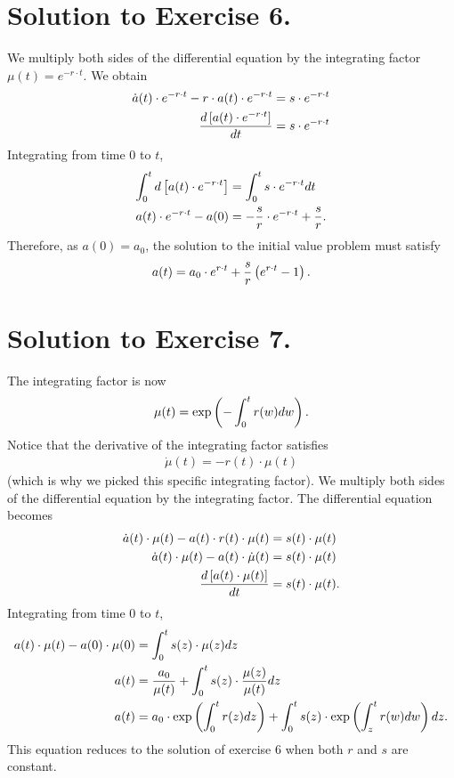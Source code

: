 \documentclass[letterpaper,12pt,leqno]{article}
\begin{document}
\section*{Solution to Exercise 6.}

We multiply both sides of the differential equation by the integrating factor $\mu (t)=e^{-r\cdot t}$. We obtain
\begin{align*}
\dot{a}(t)\cdot e^{-r\cdot t}-r\cdot a(t) \cdot e^{-r\cdot t}&=s\cdot e^{-r\cdot t}\\
\frac{d \left[ a(t)\cdot e^{-r\cdot t} \right]}{d t}&=s\cdot e^{-r\cdot t}
\end{align*}
Integrating from time $0$ to $t$, 
\begin{align*}
\int_{0}^{t}d\left[ a(t)\cdot e^{-r\cdot t} \right]&=\int_{0}^{t} s\cdot e^{-r\cdot t} dt\\
a(t)\cdot e^{-r\cdot t}-a(0)&=-\frac{s}{r}\cdot e^{-r\cdot t}+\frac{s}{r}.
\end{align*}
Therefore, as $a(0)=a_{0}$, the solution to the initial value problem must satisfy 
\begin{align*}
a(t)=a_{0}\cdot e^{r\cdot t}+\frac{s}{r}\left( e^{r\cdot t}-1 \right).
\end{align*}

\section*{Solution to Exercise 7.}

The integrating factor is now
\begin{align*}
\mu (t)=\exp \bp{-\int_{0}^{t}r(w) dw} .
\end{align*}
Notice that the derivative of the integrating factor satisfies
\begin{align*}
\dot{\mu} (t)=-r(t)\cdot \mu(t)
\end{align*}
(which is why we picked this specific integrating factor). We multiply both sides of the differential equation by the integrating factor. The differential equation becomes
\begin{align*}
\dot{a}(t)\cdot \mu (t)- a(t)\cdot r(t)\cdot \mu (t)&=s(t)\cdot \mu (t)\\
\dot{a}(t)\cdot \mu (t)- a(t)\cdot  \dot{\mu} (t)&=s(t)\cdot \mu (t)\\
\frac{d \left[ a(t)\cdot \mu (t) \right]}{d t}&=s(t)\cdot \mu (t).
\end{align*}
Integrating from time $0$ to $t$, 
\begin{align*}
a(t)\cdot \mu (t)-a(0)\cdot \mu(0)&=\int_{0}^{t}s(z) \cdot \mu (z) dz\\
a(t)&=\frac{a_{0}}{\mu (t)}+\int_{0}^{t}s(z) \cdot \frac{\mu (z)}{\mu (t)} dz\\
a(t)&=a_{0}\cdot \exp \bp{\int_{0}^{t}r(z) dz}+\int_{0}^{t}s(z) \cdot  \exp \bp{\int_{z}^{t}r(w) dw} dz.
\end{align*}
This equation reduces to the solution of exercise 6 when both $r$ and $s$ are constant. 
\end{document}
